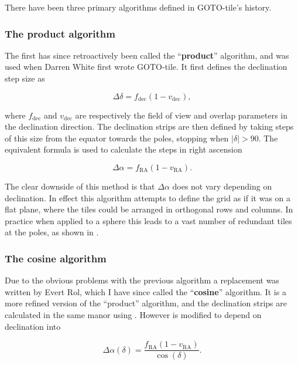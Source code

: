 \begin{colsection}
\begin{colsection}
There have been three primary algorithms defined in GOTO-tile's history.

\subsubsection{The product algorithm}

The first has since retroactively been called the ``\textbf{product}'' algorithm, and was used when Darren White first wrote GOTO-tile. It first defines the declination step size as

\begin{equation}
    \Delta\delta = f_\text{dec}(1-v_\text{dec}),
    \label{eq:product_deltadelta}
\end{equation}

where $f_\text{dec}$ and $v_\text{dec}$ are respectively the field of view and overlap parameters in the declination direction. The declination strips are then defined by taking steps of this size from the equator towards the poles, stopping when $|\delta| > 90$. The equivalent formula is used to calculate the steps in right ascension

\begin{equation}
    \Delta\alpha = f_\text{RA}(1-v_\text{RA}).
    \label{eq:product_deltaalpha}
\end{equation}

The clear downside of this method is that $\Delta\alpha$ does not vary depending on declination. In effect this algorithm attempts to define the grid as if it was on a flat plane, where the tiles could be arranged in orthogonal rows and columns. In practice when applied to a sphere this leads to a vast number of redundant tiles at the poles, as shown in .

\subsubsection{The cosine algorithm}

Due to the obvious problems with the previous algorithm a replacement was written by Evert Rol, which I have since called the ``\textbf{cosine}'' algorithm. It is a more refined version of the ``product'' algorithm, and the declination strips are calculated in the same manor using . However  is modified to depend on declination into

\begin{equation}
    \Delta\alpha(\delta) = \frac{f_\text{RA}(1-v_\text{RA})}{\cos(\delta)}.
    \label{eq:cosine_deltaalpha}
\end{equation}


\end{colsection}
\end{colsection}

